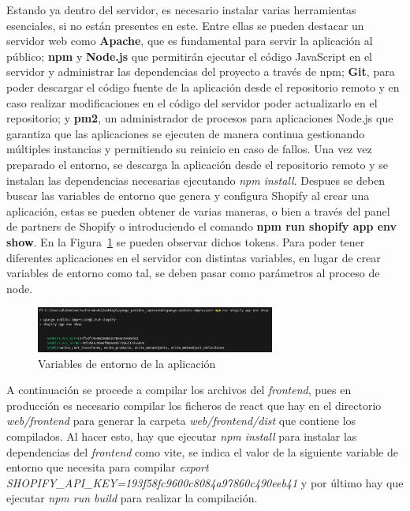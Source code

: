 \documentclass[11pt]{article}
\begin{document}
Estando ya dentro del servidor, es necesario instalar varias herramientas esenciales, si no están presentes en este. Entre ellas se pueden destacar un servidor web como \textbf{Apache}, que es fundamental para servir la aplicación
al público; \textbf{npm} y \textbf{Node.js} que permitirán ejecutar el código JavaScript en el servidor y administrar las dependencias del proyecto a través de npm; \textbf{Git}, para poder descargar el código fuente de la aplicación desde 
el repositorio remoto y en caso realizar modificaciones en el código del servidor poder actualizarlo en el repositorio; y \textbf{pm2}, un administrador de 
procesos para aplicaciones Node.js que garantiza que las aplicaciones se ejecuten de manera continua gestionando múltiples instancias y permitiendo su reinicio en caso de fallos.
Una vez vez preparado el entorno, se descarga la aplicación desde el repositorio remoto y se instalan las dependencias necesarias ejecutando \textit{npm install}. Despues se deben buscar las variables de entorno que genera y configura Shopify al crear una aplicación,
estas se pueden obtener de varias maneras, o bien a través del panel de partners de Shopify o introduciendo el comando \textbf{npm run shopify app env show}. En la Figura~\ref{fig:VariablesEntorno} se pueden observar dichos tokens. Para poder 
tener diferentes aplicaciones en el servidor con distintas variables, en lugar de crear variables de entorno como tal, se deben pasar como parámetros al proceso de node.

\begin{figure}[H]
    \centering
    \includegraphics[width=0.7\textwidth]{imagenes/variablesEntornoDespliegue.png}
    \caption{\label{fig:VariablesEntorno}Variables de entorno de la aplicación}
    \vspace{\fill}
\end{figure}

A continuación se procede a compilar los archivos del \textit{frontend}, pues en producción es necesario compilar los ficheros de react que hay en el directorio \textit{web/frontend} 
para generar la carpeta \textit{web/frontend/dist} que contiene los compilados. Al hacer esto, hay que ejecutar \textit{npm install} para instalar las dependencias del \textit{frontend} como vite,
se indica el valor de la siguiente variable de entorno que necesita para compilar \textit{export SHOPIFY\_API\_KEY=193f58fc9600c8084a97860c490eeb41} y por último hay que ejecutar \textit{npm run build} para realizar
la compilación.
\end{document}
